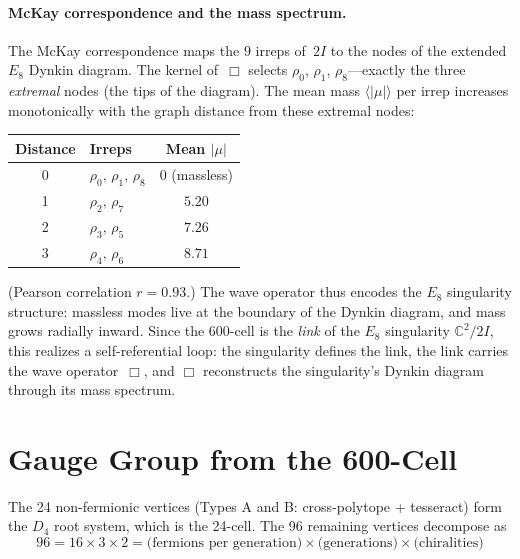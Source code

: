 \documentclass[12pt,a4paper]{article}
\theoremstyle{definition}
\begin{document}
\paragraph{McKay correspondence and the mass spectrum.}
The McKay correspondence maps the $9$ irreps of~$2I$ to the nodes of the extended $E_8$ Dynkin diagram.  The kernel of~$\Box$ selects $\rho_0$, $\rho_1$, $\rho_8$---exactly the three \emph{extremal} nodes (the tips of the diagram).  The mean mass $\langle|\mu|\rangle$ per irrep increases monotonically with the graph distance from these extremal nodes:
\begin{center}
\begin{tabular}{clc}
\toprule
Distance & Irreps & Mean $|\mu|$ \\
\midrule
0 & $\rho_0,\, \rho_1,\, \rho_8$ & $0$ (massless) \\
1 & $\rho_2,\, \rho_7$ & $5.20$ \\
2 & $\rho_3,\, \rho_5$ & $7.26$ \\
3 & $\rho_4,\, \rho_6$ & $8.71$ \\
\bottomrule
\end{tabular}
\end{center}
(Pearson correlation $r = 0.93$.)  The wave operator thus encodes the $E_8$ singularity structure: massless modes live at the boundary of the Dynkin diagram, and mass grows radially inward.  Since the 600-cell is the \emph{link} of the $E_8$ singularity $\mathbb{C}^2/2I$, this realizes a self-referential loop: the singularity defines the link, the link carries the wave operator~$\Box$, and $\Box$ reconstructs the singularity's Dynkin diagram through its mass spectrum.



\section{Gauge Group from the 600-Cell}
\label{sec:gauge}

The 24 non-fermionic vertices (Types A and B: cross-polytope + tesseract) form the $D_4$ root system, which is the 24-cell. The 96 remaining vertices decompose as
\begin{equation}
96 = 16 \times 3 \times 2 = \text{(fermions per generation)} \times \text{(generations)} \times \text{(chiralities)}
\end{equation}
\end{document}
